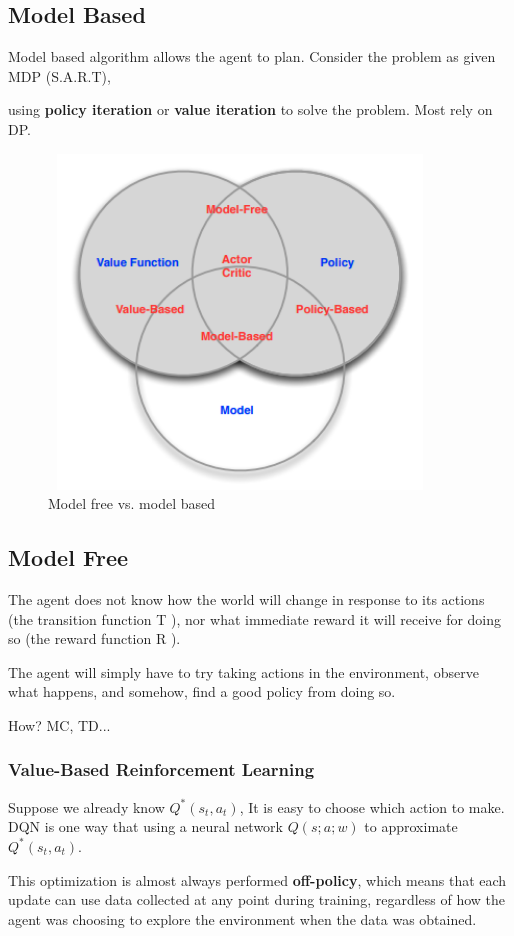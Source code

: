 \documentclass{article}
\begin{document}
\begin{CJK*}{UTF8}{gbsn}
\subsection{Model Based}
Model based algorithm allows the agent to plan. Consider the problem as given MDP (S.A.R.T), 

using \textbf{policy iteration} or \textbf{value iteration} to solve the problem. Most rely on DP.
\begin{figure}[H]
\centering
\includegraphics[width=4in,height=3.5in]{3}
\caption{Model free vs. model based}
\end{figure}


\subsection{Model Free}
The agent does not know how the world will change in response to its actions (the transition function  T ), nor what immediate reward it will receive for doing so (the reward function  R ).

The agent will simply have to try taking actions in the environment, observe what happens, and somehow, find a good policy from doing so.

How? MC, TD...

\subsubsection{Value-Based Reinforcement Learning}
Suppose we already know $Q^{*}(s_{t},a_{t})$, It is easy to choose which action to make. DQN is one way that using a neural network $Q(s;a;w)$ to approximate $Q^{*}(s_{t},a_{t})$. 

This optimization is almost always performed \textbf{off-policy}, which means that each update can use data collected at any point during training, regardless of how the agent was choosing to explore the environment when the data was obtained. 


\end{CJK*}
\end{document}
